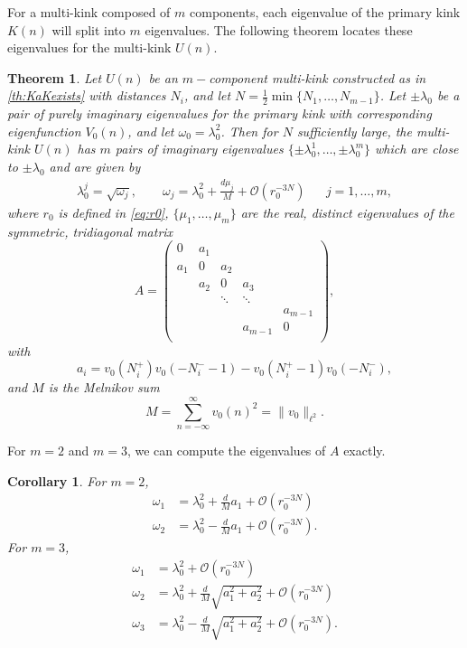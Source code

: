 \documentclass[12pt,reqno]{amsart}
\newtheorem{theorem}{Theorem}
\newtheorem{corollary}{Corollary}
\begin{document}
For a multi-kink composed of $m$ components, each eigenvalue of the primary kink $K(n)$ will split into $m$ eigenvalues. The following theorem locates these eigenvalues for the multi-kink $U(n)$.

\begin{theorem}\label{th:stability}
Let $U(n)$ be an $m-$component multi-kink constructed as in \cref{th:KaKexists} with distances $N_i$, and let $N = \frac{1}{2} \min\{ N_1, \dots, N_{m-1}\}$. Let $\pm \lambda_0$ be a pair of purely imaginary eigenvalues for the primary kink with corresponding eigenfunction $V_0(n)$, and let $\omega_0 = \lambda_0^2$. Then for $N$ sufficiently large, the multi-kink $U(n)$ has $m$ pairs of imaginary eigenvalues $\{\pm \lambda_0^1, \dots, \pm \lambda_0^m \}$ which are close to $\pm \lambda_0$ and are given by
\begin{align}\label{eq:lambdaj}
	\lambda_0^j = \sqrt{\omega_j}, \qquad
	\omega_j = \lambda_0^2 + \frac{d \mu_j}{M} + \mathcal{O}(r_0^{-3N}) && j = 1, \dots, m,
\end{align}
where $r_0$ is defined in \cref{eq:r0}, $\{ \mu_1, \dots, \mu_m \}$ are the real, distinct eigenvalues of the symmetric, tridiagonal matrix
\begin{equation}\label{eq:matrixA}
	A = \begin{pmatrix}
	0 & a_1 & & & \\
	a_1 & 0 & a_2 \\
	& a_2 & 0 & a_3 \\
	& & \ddots & \ddots & \\
	& & & & a_{m-1}  \\
	& & & a_{m-1} & 0  \\
	\end{pmatrix},
\end{equation}
with 
\begin{equation}\label{eq:ai}
	a_i = v_0(N_i^+)v_0(-N_i^- - 1) - v_0(N_i^+ - 1)v_0(-N_i^-),
\end{equation}
and $M$ is the Melnikov sum
\begin{equation}\label{eq:Minth}
	M = \sum_{n = -\infty}^{\infty} v_0(n)^2 = \| v_0 \|_{\ell^2}.
	\end{equation}
\end{theorem}

\noindent For $m = 2$ and $m = 3$, we can compute the eigenvalues of $A$ exactly.

\begin{corollary}\label{corr:m23}
For $m = 2$, 
\begin{align*}
	\omega_1 &= \lambda_0^2 + \frac{d}{M}a_1 + \mathcal{O}(r_0^{-3N}) \\
	\omega_2 &= \lambda_0^2 - \frac{d}{M}a_1 + \mathcal{O}(r_0^{-3N}).
\end{align*}
For $m = 3$,
\begin{align*}
	\omega_1 &= \lambda_0^2 + \mathcal{O}(r_0^{-3N}) \\
	\omega_2 &= \lambda_0^2 + \frac{d}{M}\sqrt{a_1^2 + a_2^2} + \mathcal{O}(r_0^{-3N}) \\
	\omega_3 &= \lambda_0^2 - \frac{d}{M}\sqrt{a_1^2 + a_2^2} + \mathcal{O}(r_0^{-3N}).
\end{align*}
\end{corollary}
\end{document}
